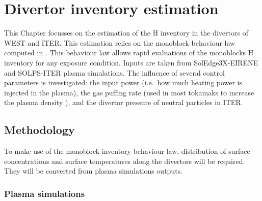 \setchapterpreamble[u]{\margintoc}
\chapter{Divertor inventory estimation}\label{Chapter4}


This Chapter focusses on the estimation of the H inventory in the divertors of WEST and ITER.
This estimation relies on the monoblock behaviour law computed in .
This behaviour law allows rapid evaluations of the monoblocks H inventory for any exposure condition.
Inputs are taken from SolEdge3X-EIRENE \cite{bufferand_three-dimensional_2019} and SOLPS-ITER \cite{kaveeva_solps-iter_2020} plasma simulations.
The influence of several control parameters is investigated: the input power (i.e.\ how much heating power is injected in the plasma), the gas puffing rate (used in most tokamaks to increase the plasma density \cite{zweben_effect_2014}), and the divertor pressure of neutral particles in ITER.


\section{Methodology}
To make use of the monoblock inventory behaviour law, distribution of surface concentrations and surface temperatures along the divertors will be required.
They will be converted from plasma simulations outputs.

\subsection{Plasma simulations}

